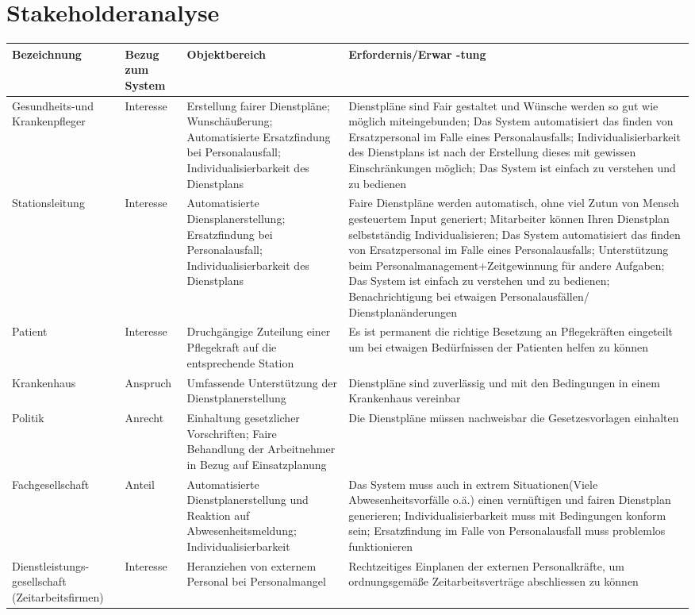 \documentclass[10pt,a4paper]{article}
\begin{document}
\section{Stakeholderanalyse}
\begin{longtable}{ |  p{3cm} |  p{3cm} | p{3cm} | p{3cm} |}
    \hline
    Bezeichnung & Bezug zum System & Objektbereich & Erfordernis/Erwar -tung \\ \hline
    Gesundheits-und Krankenpfleger & Interesse & Erstellung fairer Dienstpläne; Wunschäußerung; Automatisierte Ersatzfindung bei Personalausfall; Individualisierbarkeit des Dienstplans & Dienstpläne sind Fair gestaltet und Wünsche werden so gut wie möglich miteingebunden; Das System automatisiert das finden von Ersatzpersonal im Falle eines Personalausfalls; Individualisierbarkeit des Dienstplans ist nach der Erstellung dieses mit gewissen Einschränkungen möglich; Das System ist einfach zu verstehen und zu bedienen \\ \hline
    Stationsleitung & Interesse & Automatisierte Diensplanerstellung; Ersatzfindung bei Personalausfall; Individualisierbarkeit des Dienstplans & Faire Dienstpläne werden automatisch, ohne viel Zutun von Mensch gesteuertem Input generiert; Mitarbeiter können Ihren Dienstplan selbstständig Individualisieren; Das System automatisiert das finden von Ersatzpersonal im Falle eines Personalausfalls; Unterstützung beim Personalmanagement+Zeitgewinnung für andere Aufgaben; Das System ist einfach zu verstehen und zu bedienen; Benachrichtigung bei etwaigen Personalausfällen/ Dienstplanänderungen \\ \hline
    Patient & Interesse & Druchgängige Zuteilung einer Pflegekraft auf die entsprechende Station & Es ist permanent die richtige Besetzung an Pflegekräften eingeteilt um bei etwaigen Bedürfnissen der Patienten helfen zu können \\
    \hline
    Krankenhaus & Anspruch & Umfassende Unterstützung der Dienstplanerstellung & Dienstpläne sind zuverlässig und mit den Bedingungen in einem Krankenhaus vereinbar \\
    \hline
    Politik & Anrecht & Einhaltung gesetzlicher Vorschriften; Faire Behandlung der Arbeitnehmer in Bezug auf Einsatzplanung & Die Dienstpläne müssen nachweisbar die Gesetzesvorlagen einhalten \\
    \hline
    Fachgesellschaft & Anteil & Automatisierte Dienstplanerstellung und Reaktion auf Abwesenheitsmeldung; Individualisierbarkeit & Das System muss auch in extrem Situationen(Viele Abwesenheitsvorfälle o.ä.) einen vernüftigen und fairen Dienstplan generieren; Individualisierbarkeit muss mit Bedingungen konform sein; Ersatzfindung im Falle von Personalausfall muss problemlos funktionieren \\
    \hline
    Dienstleistungs- gesellschaft (Zeitarbeitsfirmen) & Interesse & Heranziehen von externem Personal bei Personalmangel & Rechtzeitiges Einplanen der externen Personalkräfte, um ordnungsgemäße Zeitarbeitsverträge abschliessen zu können \\
    \hline
\end{longtable}
\end{document}

